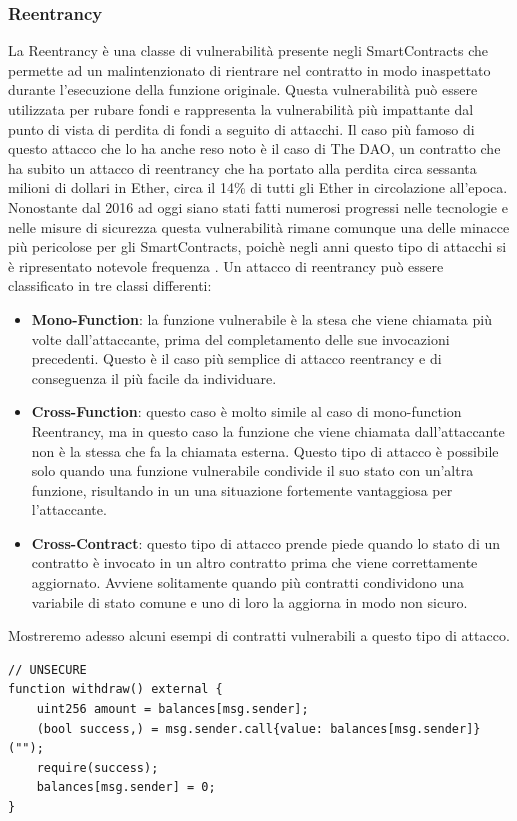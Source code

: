 \documentclass[../../Thesis.tex]{subfiles}
\begin{document}
\subsubsection{Reentrancy}
La Reentrancy è una classe di vulnerabilità presente negli SmartContracts che permette ad un malintenzionato di rientrare nel contratto in modo inaspettato durante l'esecuzione della funzione originale. Questa vulnerabilità può essere utilizzata per rubare fondi e rappresenta la vulnerabilità più impattante dal punto di vista di perdita di fondi a seguito di attacchi.
Il caso più famoso di questo attacco che lo ha anche reso noto è il caso di The DAO, un contratto che ha subito un attacco di reentrancy che ha portato alla perdita circa sessanta milioni di dollari in Ether, circa il 14\% di tutti gli Ether in circolazione all'epoca. Nonostante dal 2016 ad oggi siano stati fatti numerosi progressi nelle tecnologie e nelle misure di sicurezza questa vulnerabilità rimane comunque una delle minacce più pericolose per gli SmartContracts, poichè negli anni questo tipo di attacchi si è ripresentato notevole frequenza \cite{reentrancy-historical}. Un attacco di reentrancy può essere classificato in tre classi differenti:
\begin{itemize}
    \item \textbf{Mono-Function}: la funzione vulnerabile è la stesa che viene chiamata più volte dall'attaccante, prima del completamento delle sue invocazioni precedenti. Questo è il caso più semplice di attacco reentrancy e di conseguenza il più facile da individuare.
    \item \textbf{Cross-Function}: questo caso è molto simile al caso di mono-function Reentrancy, ma in questo caso la funzione che viene chiamata dall'attaccante non è la stessa che fa la chiamata esterna. Questo tipo di attacco è possibile solo quando una funzione vulnerabile condivide il suo stato con un'altra funzione, risultando in un una situazione fortemente vantaggiosa per l'attaccante. 
    \item \textbf{Cross-Contract}: questo tipo di attacco prende piede quando lo stato di un contratto è invocato in un altro contratto prima che viene correttamente aggiornato. Avviene solitamente quando più contratti condividono una variabile di stato comune e uno di loro la aggiorna in modo non sicuro. 
\end{itemize}
Mostreremo adesso alcuni esempi di contratti vulnerabili a questo tipo di attacco. 
\begin{lstlisting}[language=Solidity]
// UNSECURE
function withdraw() external {
    uint256 amount = balances[msg.sender];
    (bool success,) = msg.sender.call{value: balances[msg.sender]}("");
    require(success);
    balances[msg.sender] = 0;
}
\end{lstlisting}
\end{document}

